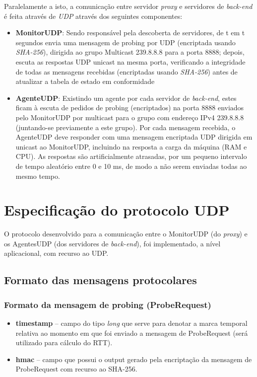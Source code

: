 \documentclass{article}
\begin{document}
Paralelamente a isto, a comunicação entre servidor \emph{proxy} e servidores de \emph{back-end} é feita através de \emph{UDP} através dos seguintes componentes:

\begin{itemize}
    \item \textbf{MonitorUDP}: Sendo responsável pela descoberta de servidores, de t em t segundos envia uma mensagem de probing por UDP (encriptada usando \emph{SHA-256}), dirigida ao grupo Multicast 239.8.8.8 para a porta 8888; depois, escuta as respostas UDP unicast na mesma porta, verificando a integridade de todas as mensagens recebidas (encriptadas usando \emph{SHA-256}) antes de atualizar a tabela de estado em conformidade
    \item \textbf{AgenteUDP}: Existindo um agente por cada servidor de \emph{back-end}, estes ficam à escuta de pedidos de probing (encriptados) na porta 8888 enviados pelo MonitorUDP por multicast para o grupo com endereço IPv4 239.8.8.8 (juntando-se previamente a este grupo). Por cada mensagem recebida, o AgenteUDP deve responder com uma mensagem encriptada UDP dirigida em unicast ao MonitorUDP, incluindo na resposta a carga da máquina (RAM e CPU). As respostas são artificialmente atrasadas, por um pequeno intervalo de tempo aleatório entre 0 e 10 ms, de modo a não serem enviadas todas ao mesmo tempo.
\end{itemize}

\section{Especificação do protocolo UDP}

O protocolo desenvolvido para a comunicação entre o MonitorUDP (do \emph{proxy}) e os AgentesUDP (dos servidores de \emph{back-end}), foi implementado, a nível aplicacional, com recurso ao UDP.

\subsection{Formato das mensagens protocolares}

\subsubsection{Formato da mensagem de probing (ProbeRequest)}

\begin{itemize}
    \item \textbf{timestamp} -- campo do tipo \emph{long} que serve para denotar a marca temporal relativa ao momento em que foi enviado a mensagem de ProbeRequest (será utilizado para cálculo do RTT).
    \item \textbf{hmac} -- campo que possui o output gerado pela encriptação da mensagem de ProbeRequest com recurso ao SHA-256.
\end{itemize}
\end{document}
